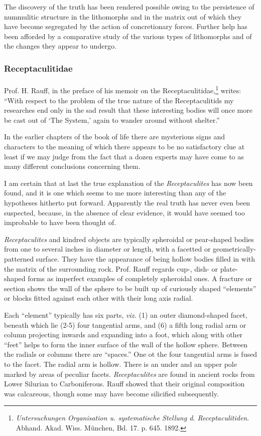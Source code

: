 \documentclass[a4paper, 12pt, oneside]{article}
\begin{document}
The discovery of the truth has been rendered possible owing to the persistence of nummulitic structure in the lithomorphs and in the matrix out of which they have become segregated by the action of concretionary forces. Further help has been afforded by a comparative study of the various types of lithomorphs and of the changes they appear to undergo.

\subsubsection{Receptaculitidae}
\paragraph{}
Prof. H. Rauff, in the preface of his memoir on the Receptaculitidae,\footnote{\emph{Untersuchungen Organisation u. systematische Stellung d. Receptaculitiden}. Abhand. Akad. Wiss. München, Bd. 17. p. 645. 1892.} writes: ``With respect to the problem of the true nature of the Receptaculitids my researches end only in the sad result that these interesting bodies will once more be cast out of `The System,' again to wander around without shelter.''

In the earlier chapters of the book of life there are mysterious signs and characters to the meaning of which there appears to be no satisfactory clue at least if we may judge from the fact that a dozen experts may have come to as many different conclusions concerning them.

I am certain that at last the true explanation of the \emph{Receptaculites} has now been found, and it is one which seems to me more interesting than any of the hypotheses hitherto put forward. Apparently the real truth has never even been suspected, because, in the absence of clear evidence, it would have seemed too improbable to have been thought of.

\emph{Receptaculites} and kindred objects are typically spheroidal or pear-shaped bodies from one to several inches in diameter or length, with a facetted or geometrically-patterned surface. They have the appearance of being hollow bodies filled in with the matrix of the surrounding rock. Prof. Rauff regards cup-, dish- or plate-shaped forms as imperfect examples of completely spheroidal ones. A fracture or section shows the wall of the sphere to be built up of curiously shaped ``elements'' or blocks fitted against each other with their long axis radial.

Each ``element'' typically has six parts, \emph{viz.} (1) an outer diamond-shaped facet, beneath which lie (2-5) four tangential arms, and (6) a fifth long radial arm or column projecting inwards and expanding into a foot, which along with other ``feet'' helps to form the inner surface of the wall of the hollow sphere. Between the radials or columns there are ``spaces.'' One ot the four tangential arms is fused to the facet. The radial arm is hollow. There is an under and an upper pole marked by areas of peculiar facets. \emph{Receptaculites} are found in ancient rocks from Lower Silurian to Carboniferous. Rauff showed that their original composition was calcareous, though some may have become silicified subsequently.
\end{document}
